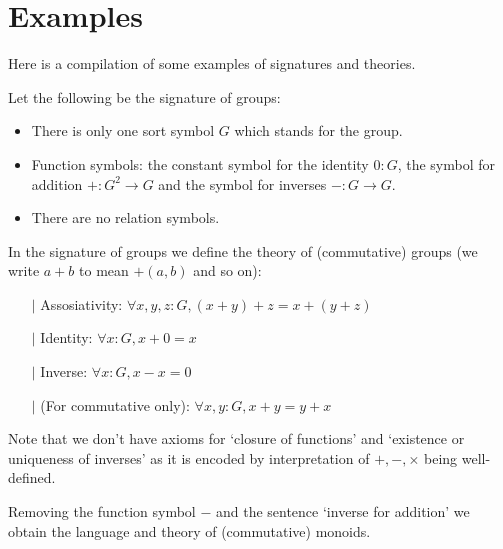 \section{Examples}

Here is a compilation of some examples of signatures and theories.

\begin{dfn}
    Let the following be the signature of groups:
    \begin{itemize}
        \item There is only one sort symbol $G$ which stands for the group.
        \item Function symbols: the constant symbol for the identity 
        $0 : G$, the symbol for addition $+ : G^2 \to G$ 
        and the symbol for inverses $- : G \to G$.
        \item There are no relation symbols.
    \end{itemize}
    
    In the signature of groups we define the theory of (commutative) groups
    (we write $a + b$ to mean $+(a,b)$ and so on):
    \begin{itemize}
        \item[$\vert$] Assosiativity: 
            $\forall x, y, z : G, (x + y) + z = x + (y + z)$
        \item[$\vert$] Identity:
            $\forall x : G, x + 0 = x$ 
        \item[$\vert$] Inverse: $\forall x : G, x - x = 0$ 
        \item[$\vert$] (For commutative only): 
            $\forall x, y : G, x + y = y + x$
    \end{itemize}
    Note that we don't have axioms for `closure of functions'
    and `existence or uniqueness of inverses' as
    it is encoded by interpretation of 
    $+, -, \times$ being well-defined.
    
    Removing the function symbol $-$ and the sentence `inverse for addition' 
    we obtain the language and theory of (commutative) monoids.
\end{dfn}

